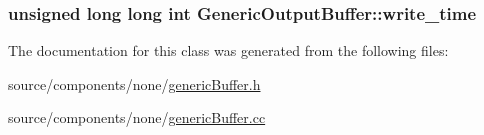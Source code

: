 \hypertarget{classGenericOutputBuffer_f201a673a51bd864907116c48a053f97}{
\subsubsection[{write\_\-time}]{\setlength{\rightskip}{0pt plus 5cm}unsigned long long int {\bf GenericOutputBuffer::write\_\-time}}}
\label{classGenericOutputBuffer_f201a673a51bd864907116c48a053f97}




The documentation for this class was generated from the following files:\begin{CompactItemize}
\item 
source/components/none/\hyperlink{none_2genericBuffer_8h}{genericBuffer.h}\item 
source/components/none/\hyperlink{none_2genericBuffer_8cc}{genericBuffer.cc}\end{CompactItemize}
